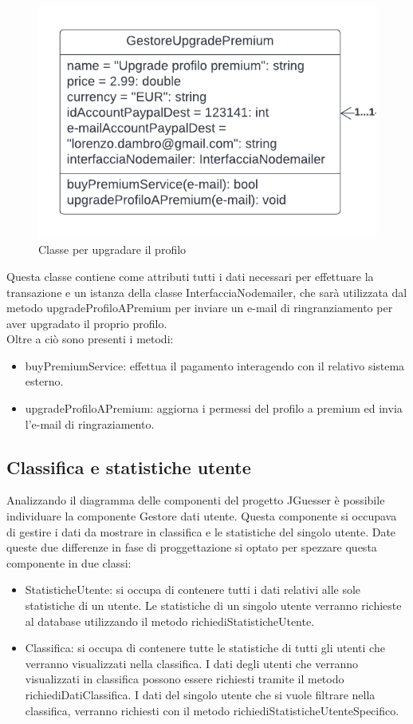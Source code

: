 \begin{figure}[!h]
\centering
\includegraphics[scale=0.35]{images/classe_upgrade_profilo.png}
\caption{Classe per upgradare il profilo}
\label{fig:classe_upgrade_profilo}
\end{figure}
\noindent
Questa classe contiene come attributi tutti i dati necessari per effettuare la transazione e un istanza della classe InterfacciaNodemailer, che sarà utilizzata dal metodo upgradeProfiloAPremium per inviare un e-mail di ringranziamento per aver upgradato il proprio profilo. \\
Oltre a ciò sono presenti i metodi:
\begin{itemize}
    \item buyPremiumService: effettua il pagamento interagendo con il relativo sistema esterno.
    \item upgradeProfiloAPremium: aggiorna i permessi del profilo a premium ed invia l'e-mail di ringraziamento.
\end{itemize}

\subsection{Classifica e statistiche utente}
Analizzando il diagramma delle componenti del progetto JGuesser è possibile individuare la componente Gestore dati utente. Questa componente si occupava di gestire i dati da mostrare in classifica e le statistiche del singolo utente. Date queste due differenze in fase di proggettazione si optato per spezzare questa componente in due classi:
\begin{itemize}
    \item StatisticheUtente: si occupa di contenere tutti i dati relativi alle sole statistiche di un utente. Le statistiche di un singolo utente verranno richieste al database utilizzando il metodo richiediStatisticheUtente.
    \item Classifica: si occupa di contenere tutte le statistiche di tutti gli utenti che verranno visualizzati nella classifica. I dati degli utenti che verranno visualizzati in classifica possono essere richiesti tramite il metodo richiediDatiClassifica. I dati del singolo utente che si vuole filtrare nella classifica, verranno richiesti con il metodo richiediStatisticheUtenteSpecifico.
\end{itemize}

